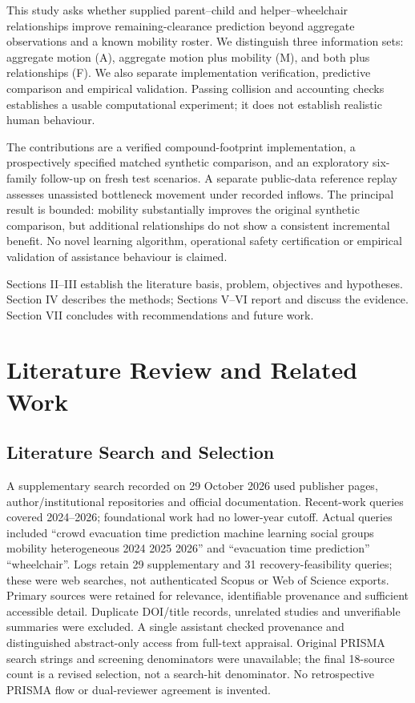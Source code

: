 \documentclass[conference]{IEEEtran}
\begin{document}
This study asks whether supplied parent--child and helper--wheelchair relationships improve remaining-clearance prediction beyond aggregate observations and a known mobility roster. We distinguish three information sets: aggregate motion (A), aggregate motion plus mobility (M), and both plus relationships (F). We also separate implementation verification, predictive comparison and empirical validation. Passing collision and accounting checks establishes a usable computational experiment; it does not establish realistic human behaviour.

The contributions are a verified compound-footprint implementation, a prospectively specified matched synthetic comparison, and an exploratory six-family follow-up on fresh test scenarios. A separate public-data reference replay assesses unassisted bottleneck movement under recorded inflows. The principal result is bounded: mobility substantially improves the original synthetic comparison, but additional relationships do not show a consistent incremental benefit. No novel learning algorithm, operational safety certification or empirical validation of assistance behaviour is claimed.

Sections II--III establish the literature basis, problem, objectives and hypotheses. Section IV describes the methods; Sections V--VI report and discuss the evidence. Section VII concludes with recommendations and future work.

\section{Literature Review and Related Work}
\subsection{Literature Search and Selection}
A supplementary search recorded on 29 October 2026 used publisher pages, author/institutional repositories and official documentation. Recent-work queries covered 2024--2026; foundational work had no lower-year cutoff. Actual queries included ``crowd evacuation time prediction machine learning social groups mobility heterogeneous 2024 2025 2026'' and ``evacuation time prediction'' ``wheelchair''. Logs retain 29 supplementary and 31 recovery-feasibility queries; these were web searches, not authenticated Scopus or Web of Science exports. Primary sources were retained for relevance, identifiable provenance and sufficient accessible detail. Duplicate DOI/title records, unrelated studies and unverifiable summaries were excluded. A single assistant checked provenance and distinguished abstract-only access from full-text appraisal. Original PRISMA search strings and screening denominators were unavailable; the final 18-source count is a revised selection, not a search-hit denominator. No retrospective PRISMA flow or dual-reviewer agreement is invented.
\end{document}
